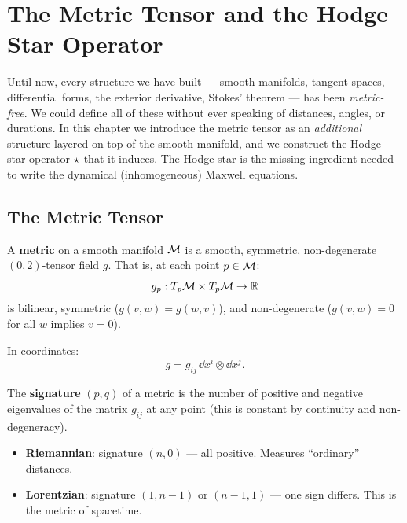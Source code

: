 \chapter{The Metric Tensor and the Hodge Star Operator}

Until now, every structure we have built --- smooth manifolds, tangent spaces, differential forms, the exterior derivative, Stokes' theorem --- has been \emph{metric-free}. We could define all of these without ever speaking of distances, angles, or durations. In this chapter we introduce the metric tensor as an \emph{additional} structure layered on top of the smooth manifold, and we construct the Hodge star operator $\star$ that it induces. The Hodge star is the missing ingredient needed to write the dynamical (inhomogeneous) Maxwell equations.

\section{The Metric Tensor}

\begin{definition}
A \textbf{metric} on a smooth manifold $\mathcal{M}$ is a smooth, symmetric, non-degenerate $(0,2)$-tensor field $g$. That is, at each point $p \in \mathcal{M}$:
\begin{equation}
g_p: T_p\mathcal{M} \times T_p\mathcal{M} \to \mathbb{R}
\end{equation}
is bilinear, symmetric ($g(v,w) = g(w,v)$), and non-degenerate ($g(v,w) = 0$ for all $w$ implies $v = 0$).
\end{definition}

In coordinates:
\begin{equation}
g = g_{ij}\,\dd x^i \otimes \dd x^j.
\end{equation}

\begin{definition}[Signature]
The \textbf{signature} $(p, q)$ of a metric is the number of positive and negative eigenvalues of the matrix $g_{ij}$ at any point (this is constant by continuity and non-degeneracy).
\begin{itemize}
\item \textbf{Riemannian}: signature $(n, 0)$ --- all positive. Measures ``ordinary'' distances.
\item \textbf{Lorentzian}: signature $(1, n{-}1)$ or $(n{-}1, 1)$ --- one sign differs. This is the metric of spacetime.
\end{itemize}
\end{definition}

